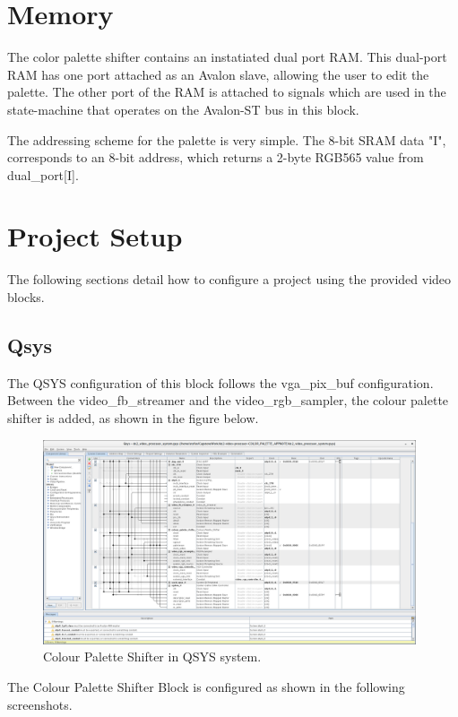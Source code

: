 \documentclass{capstonedoc}
\begin{document}
\section{Memory}

The color palette shifter contains an instatiated dual port RAM. This dual-port
RAM has one port attached as an Avalon slave, allowing the user to edit the 
palette. The other port of the RAM is attached to signals which are used in the
state-machine that operates on the Avalon-ST bus in this block. 

The addressing scheme for the palette is very simple. The 8-bit SRAM data "I",
corresponds to an 8-bit address, which returns a 2-byte RGB565 value from 
dual\_port[I].

\section{Project Setup}

The following sections detail how to configure a project using the provided
video blocks.

\subsection{Qsys}

The QSYS configuration of this block follows the vga_pix_buf configuration. 
Between the video\_fb\_streamer and the video\_rgb\_sampler, the colour palette
shifter is added, as shown in the figure below.

\begin{figure}[ht]
  \centering
  \includegraphics[width=11cm]{qsys_2}
  \caption{Colour Palette Shifter in QSYS system.}
  \label{fig:qsys_2}
\end{figure}

The Colour Palette Shifter Block is configured as shown in the following
screenshots.
\end{document}
